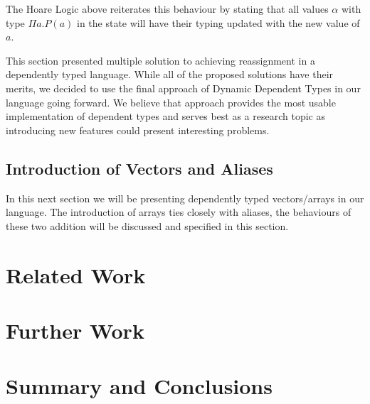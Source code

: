\documentclass[a4paper,12pt]{report}
\begin{document}
\par
The Hoare Logic above reiterates this behaviour by stating that all values $\alpha$ with 
type $\Pi a.P(a)$ in the state will have their typing updated with the new value 
of $a$.

This section presented multiple solution to achieving reassignment in a 
dependently typed language. While all of the proposed solutions have their 
merits, we decided to use the final approach of Dynamic Dependent Types in our 
language going forward. We believe that approach provides the most usable 
implementation of dependent types and serves best as a research topic as 
introducing new features could present interesting problems. 

\section{Introduction of Vectors and Aliases}
In this next section we will be presenting dependently typed vectors/arrays in 
our language. The introduction of arrays ties closely with aliases, the 
behaviours of these two addition will be discussed and specified in this 
section.

\chapter{Related Work}

\chapter{Further Work}

\chapter{Summary and Conclusions} 


\appendix
\singlespacing

\printbibliography
\end{document}
